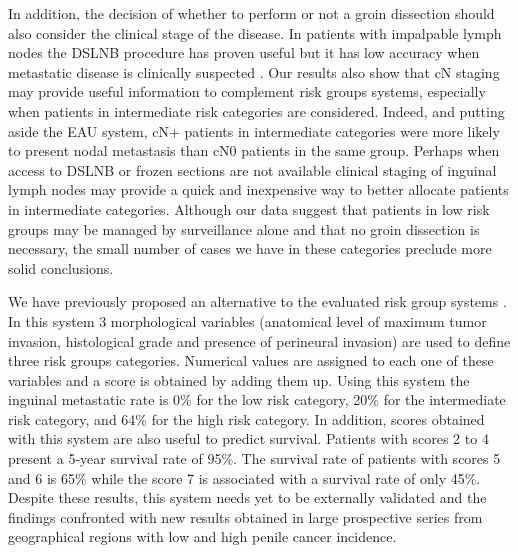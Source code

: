 \documentclass[11pt,letterpaper]{article}\usepackage[]{graphicx}\usepackage[]{color}
\begin{document}
\begin{multicols}{2}
In addition, the decision of whether to perform or not a groin dissection should also consider the clinical stage of the disease. In patients with impalpable lymph nodes the DSLNB procedure has proven useful but it has low accuracy when metastatic disease is clinically suspected \cite{Leijte2007,Kroon2005,Heyns2008,Hungerhuber2006a}. Our results also show that cN staging may provide useful information to complement risk groups systems, especially when patients in intermediate risk categories are considered. Indeed, and putting aside the EAU system, cN+ patients in intermediate categories were more likely to present nodal metastasis than cN0 patients in the same group. Perhaps when access to DSLNB or frozen sections are not available clinical staging of inguinal lymph nodes may provide a quick and inexpensive way to better allocate patients in intermediate categories. Although our data suggest that patients in low risk groups may be managed by surveillance alone and that no groin dissection is necessary, the small number of cases we have in these categories preclude more solid conclusions.

We have previously proposed an alternative to the evaluated risk group systems \cite{Chaux2009}. In this system 3 morphological variables (anatomical level of maximum tumor invasion, histological grade and presence of perineural invasion) are used to define three risk groups categories. Numerical values are assigned to each one of these variables and a score is obtained by adding them up. Using this system the inguinal metastatic rate is 0\% for the low risk category, 20\% for the intermediate risk category, and 64\% for the high risk category. In addition, scores obtained with this system are also useful to predict survival. Patients with scores 2 to 4 present a 5-year survival rate of 95\%. The survival rate of patients with scores 5 and 6 is 65\% while the score 7 is associated with a survival rate of only 45\%. Despite these results, this system needs yet to be externally validated and the findings confronted with new results obtained in large prospective series from geographical regions with low and high penile cancer incidence.


\end{multicols}
\end{document}
